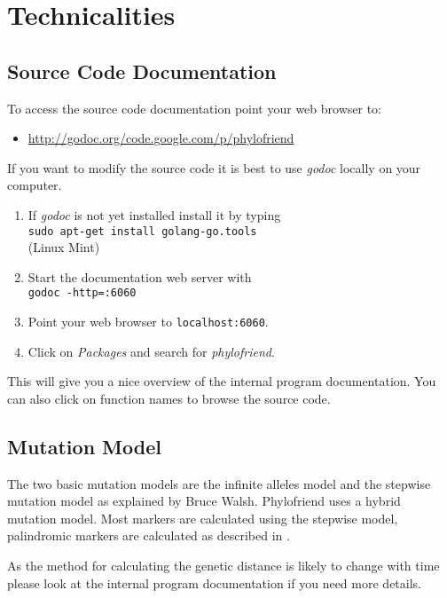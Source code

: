 \section{Technicalities}

\subsection{Source Code Documentation}

To access the source code documentation point your
web browser to:

\begin{itemize}
\item \href{http://godoc.org/code.google.com/p/phylofriend}{http://godoc.org/code.google.com/p/phylofriend}
\end{itemize}

If you want to modify the source code it is best to
use \emph{godoc} locally on your computer.

\begin{enumerate}
\item If \emph{godoc} is not yet installed install it by typing\\
	\texttt{sudo apt-get install golang-go.tools}\\
	(Linux Mint)
\item Start the documentation web server with\\
	\texttt{godoc -http=:6060}
\item Point your web browser to \texttt{localhost:6060}.
\item Click on \emph{Packages} and search for \emph{phylofriend}.
\end{enumerate}

This will give you a nice overview of the internal program
documentation. You can also click on function names to browse
the source code.


\subsection{Mutation Model}

The two basic mutation models are the infinite alleles model
and the stepwise mutation model as explained by Bruce Walsh\cite{Wal02}.
Phylofriend uses a hybrid mutation model. Most markers are
calculated using the stepwise model, palindromic markers are
calculated as described in \cite{Can14}.

As the method for calculating the genetic distance is likely
to change with time please look at the internal program
documentation if you need more details.


